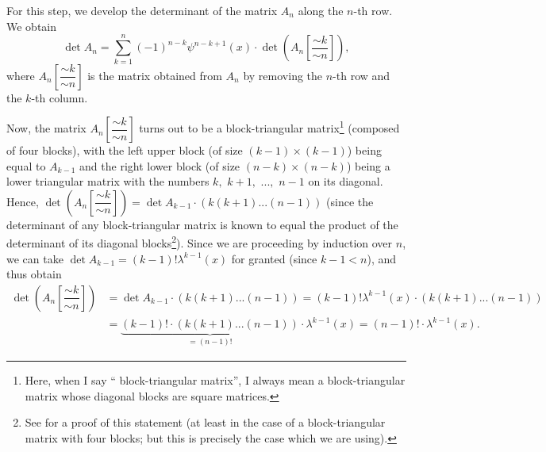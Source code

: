 \documentclass[numbers=enddot,12pt,final,onecolumn,notitlepage]{scrartcl}%
\begin{document}
For this step, we develop the determinant of the matrix $A_{n}$ along the
$n$-th row. We obtain%
\begin{equation}
\det A_{n}=\sum_{k=1}^{n}\left(  -1\right)  ^{n-k}\psi^{n-k+1}\left(
x\right)  \cdot\det\left(  A_{n}\left[  \dfrac{\sim k}{\sim n}\right]
\right)  , \label{9.ex3.s2}%
\end{equation}
where $A_{n}\left[  \dfrac{\sim k}{\sim n}\right]  $ is the matrix obtained
from $A_{n}$ by removing the $n$-th row and the $k$-th column.

Now, the matrix $A_{n}\left[  \dfrac{\sim k}{\sim n}\right]  $ turns out to be
a block-triangular matrix\footnote{Here, when I say \textquotedblleft
block-triangular matrix\textquotedblright, I always mean a block-triangular
matrix whose diagonal blocks are square matrices.} (composed of four blocks),
with the left upper block (of size $\left(  k-1\right)  \times\left(
k-1\right)  $) being equal to $A_{k-1}$ and the right lower block (of size
$\left(  n-k\right)  \times\left(  n-k\right)  $) being a lower triangular
matrix with the numbers $k,$ $k+1,$ $...,$ $n-1$ on its diagonal. Hence,
$\det\left(  A_{n}\left[  \dfrac{\sim k}{\sim n}\right]  \right)  =\det
A_{k-1}\cdot\left(  k\left(  k+1\right)  ...\left(  n-1\right)  \right)  $
(since the determinant of any block-triangular matrix is known to equal the
product of the determinant of its diagonal blocks\footnote{See \cite[Exercise
43]{Grin-detn} for a proof of this statement (at least in the case of a
block-triangular matrix with four blocks; but this is precisely the case which
we are using).}). Since we are proceeding by induction over $n$, we can take
$\det A_{k-1}=\left(  k-1\right)  !\lambda^{k-1}\left(  x\right)  $ for
granted (since $k-1<n$), and thus obtain%
\begin{align*}
\det\left(  A_{n}\left[  \dfrac{\sim k}{\sim n}\right]  \right)   &  =\det
A_{k-1}\cdot\left(  k\left(  k+1\right)  ...\left(  n-1\right)  \right)
=\left(  k-1\right)  !\lambda^{k-1}\left(  x\right)  \cdot\left(  k\left(
k+1\right)  ...\left(  n-1\right)  \right) \\
&  =\underbrace{\left(  k-1\right)  !\cdot\left(  k\left(  k+1\right)
...\left(  n-1\right)  \right)  }_{=\left(  n-1\right)  !}\cdot\lambda
^{k-1}\left(  x\right)  =\left(  n-1\right)  !\cdot\lambda^{k-1}\left(
x\right)  .
\end{align*}
\end{document}
